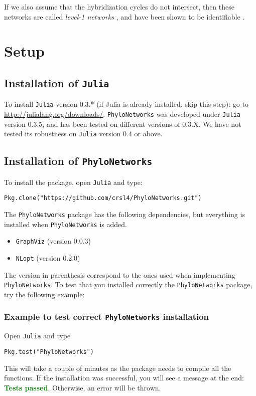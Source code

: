 \documentclass[12pt]{article}
\newcommand{\falta}[1]{\textcolor{red}{#1}}
\begin{document}
If we also assume that the hybridization cycles do not intersect, then
these networks are called \textit{level-1 networks} \citep{Huson2010},
and have been shown to be identifiable
\citep{Pardi2015,Solis-Lemus2015}.


\section{Setup}
\subsection{Installation of \texttt{Julia}}
To install \texttt{Julia} version 0.3.* (if Julia is already installed, skip
this step): go to \url{http://julialang.org/downloads/}.
\texttt{PhyloNetworks} was developed under \texttt{Julia}
version 0.3.5, and has been tested on different versions of 0.3.X.
We have not tested its robustness on \texttt{Julia} version 0.4 or above.

\subsection{Installation of \texttt{PhyloNetworks}}
To install the package, %
open
\texttt{Julia} and type:
\begin{lstlisting}
Pkg.clone("https://github.com/crsl4/PhyloNetworks.git")
\end{lstlisting}

The \texttt{PhyloNetworks} package has the following dependencies, but everything is installed when
\texttt{PhyloNetworks} is added.
\begin{itemize}
\item \texttt{GraphViz} (version 0.0.3)
\item \texttt{NLopt} (version 0.2.0)
\end{itemize}
The version in parenthesis correspond to the ones used when
implementing \texttt{PhyloNetworks}.
To test that you installed correctly the \texttt{PhyloNetworks} package, try the following example:

\subsubsection{Example to test correct \texttt{PhyloNetworks} installation}
Open \texttt{Julia} and type
\begin{lstlisting}
Pkg.test("PhyloNetworks")
\end{lstlisting}
This will take a couple of
minutes as the package needs to compile all the functions. If the
installation was successful, you will see a message at the end:
\textcolor{green}{\textbf{Tests passed}}. Otherwise, an error will be thrown.
\end{document}
